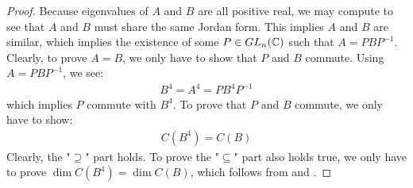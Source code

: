 \documentclass{report}
\begin{document}
\begin{proof}
Because eigenvalues of $A$ and  $B$ are all positive real, we may compute  to see that $A$ and $B$ must share the same Jordan form. This implies $A$ and  $B$ are similar, which implies the existence of some $P\in GL_n(\mathbb{C})$ such that $A=PBP^{-1}$. Clearly, to prove $A=B$, we only have to show that  $P$ and  $B$ commute. Using $A=PBP^{-1}$, we see: 
\begin{align*}
B^4=A^4= PB^4 P^{-1}
\end{align*}
which implies $P$ commute with  $B^4$. To prove that $P$ and  $B$ commute, we only have to show: 
\begin{align*}
C(B^4) = C(B)
\end{align*}
Clearly, the "$\supseteq$" part holds. To prove the "$\subseteq$" part also holds true, we only have to prove  $\operatorname{dim}C(B^4)= \operatorname{dim}C(B)$, which  follows from   and . 
\end{proof}
\end{document}
